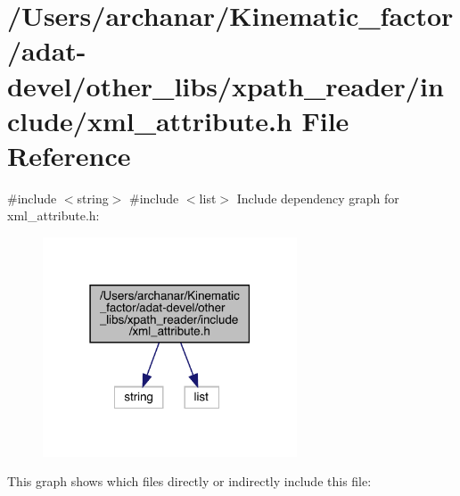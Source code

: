\hypertarget{adat-devel_2other__libs_2xpath__reader_2include_2xml__attribute_8h}{}\section{/\+Users/archanar/\+Kinematic\+\_\+factor/adat-\/devel/other\+\_\+libs/xpath\+\_\+reader/include/xml\+\_\+attribute.h File Reference}
\label{adat-devel_2other__libs_2xpath__reader_2include_2xml__attribute_8h}
{\ttfamily \#include $<$string$>$}\newline
{\ttfamily \#include $<$list$>$}\newline
Include dependency graph for xml\+\_\+attribute.\+h\+:
\nopagebreak
\begin{figure}[H]
\begin{center}
\leavevmode
\includegraphics[width=214pt]{d6/de9/adat-devel_2other__libs_2xpath__reader_2include_2xml__attribute_8h__incl}
\end{center}
\end{figure}
This graph shows which files directly or indirectly include this file\+:
\nopagebreak
